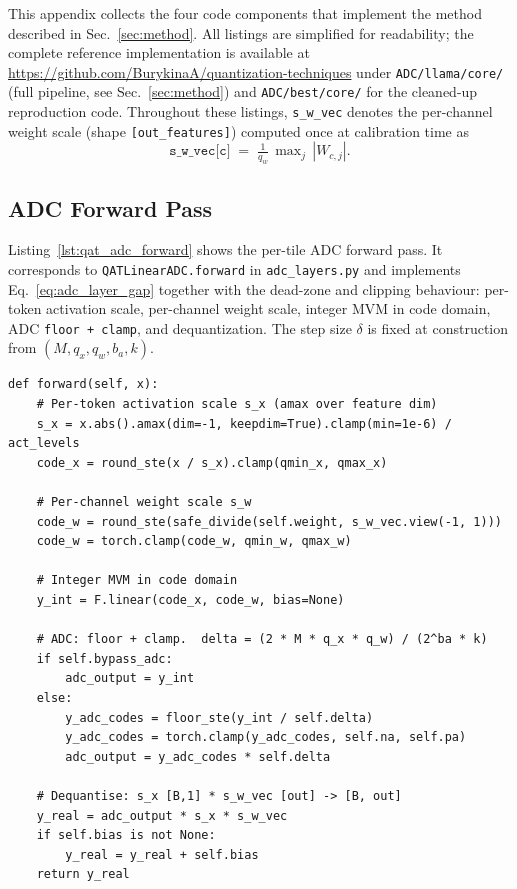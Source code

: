 \documentclass[a4paper,11pt,oneside]{article}
\theoremstyle{breakstyle}
\begin{document}
  This appendix collects the four code components that implement the
  method described in Sec.~\ref{sec:method}. All listings are
  simplified for readability; the complete reference implementation
  is available at
  \url{https://github.com/BurykinaA/quantization-techniques}
  under \texttt{ADC/llama/core/} (full
  pipeline, see Sec.~\ref{sec:method}) and \texttt{ADC/best/core/}
  for the cleaned-up reproduction code.  Throughout these listings,
  \texttt{s\_w\_vec} denotes the per-channel weight scale (shape
  \texttt{[out\_features]}) computed once at calibration time as
  \[
      \texttt{s\_w\_vec[c]} \;=\; \tfrac{1}{q_w}\,\max\nolimits_{j}\,|W_{c, j}|.
  \]

  \subsection{ADC Forward Pass}
  \label{app:code:adc}

  Listing~\ref{lst:qat_adc_forward} shows the per-tile ADC forward
  pass.  It corresponds to \texttt{QATLinearADC.forward} in
  \texttt{adc\_layers.py} and implements Eq.~\eqref{eq:adc_layer_gap}
  together with the dead-zone and clipping behaviour: per-token
  activation scale, per-channel weight scale, integer MVM in code
  domain, ADC \texttt{floor + clamp}, and dequantization.  The step
  size $\delta$ is fixed at construction from
  $(M, q_x, q_w, b_a, k)$.

\begin{lstlisting}[label={lst:qat_adc_forward},caption={Per-tile ADC forward pass (\texttt{QATLinearADC.forward}).}]
def forward(self, x):
    # Per-token activation scale s_x (amax over feature dim)
    s_x = x.abs().amax(dim=-1, keepdim=True).clamp(min=1e-6) / act_levels
    code_x = round_ste(x / s_x).clamp(qmin_x, qmax_x)

    # Per-channel weight scale s_w
    code_w = round_ste(safe_divide(self.weight, s_w_vec.view(-1, 1)))
    code_w = torch.clamp(code_w, qmin_w, qmax_w)

    # Integer MVM in code domain
    y_int = F.linear(code_x, code_w, bias=None)

    # ADC: floor + clamp.  delta = (2 * M * q_x * q_w) / (2^ba * k)
    if self.bypass_adc:
        adc_output = y_int
    else:
        y_adc_codes = floor_ste(y_int / self.delta)
        y_adc_codes = torch.clamp(y_adc_codes, self.na, self.pa)
        adc_output = y_adc_codes * self.delta

    # Dequantise: s_x [B,1] * s_w_vec [out] -> [B, out]
    y_real = adc_output * s_x * s_w_vec
    if self.bias is not None:
        y_real = y_real + self.bias
    return y_real
\end{lstlisting}
\end{document}
